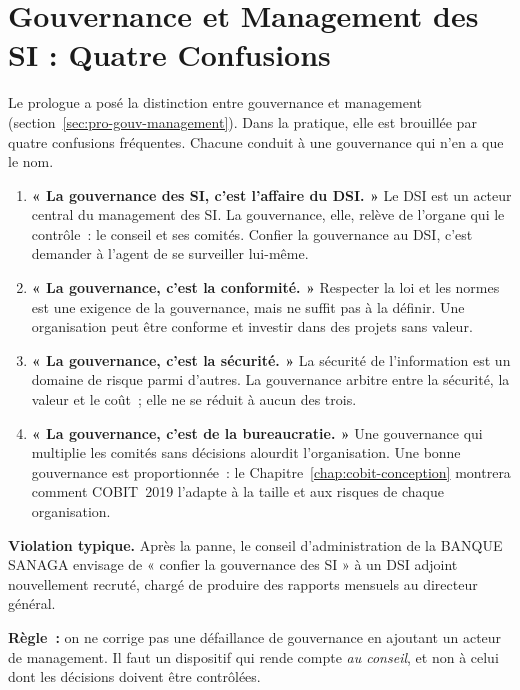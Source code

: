 \section{Gouvernance et Management des SI : Quatre Confusions}
\label{sec:c01-confusions}

Le prologue a posé la distinction entre gouvernance et management
(section~\ref{sec:pro-gouv-management}). Dans la pratique, elle est
brouillée par quatre confusions fréquentes. Chacune conduit à une
gouvernance qui n'en a que le nom.

\begin{enumerate}
    \item \textbf{« La gouvernance des SI, c'est l'affaire du DSI. »} Le DSI
          est un acteur central du management des SI. La gouvernance, elle,
          relève de l'organe qui le contrôle~: le conseil et ses comités.
          Confier la gouvernance au DSI, c'est demander à l'agent de se
          surveiller lui-même.
    \item \textbf{« La gouvernance, c'est la conformité. »} Respecter la
          loi et les normes est une exigence de la gouvernance, mais ne
          suffit pas à la définir. Une organisation peut être conforme et
          investir dans des projets sans valeur.
    \item \textbf{« La gouvernance, c'est la sécurité. »} La sécurité de
          l'information est un domaine de risque parmi d'autres. La
          gouvernance arbitre entre la sécurité, la valeur et le coût~;
          elle ne se réduit à aucun des trois.
    \item \textbf{« La gouvernance, c'est de la bureaucratie. »} Une
          gouvernance qui multiplie les comités sans décisions alourdit
          l'organisation. Une bonne gouvernance est proportionnée~: le
          Chapitre~\ref{chap:cobit-conception} montrera comment COBIT~2019
          l'adapte à la taille et aux risques de chaque organisation.
\end{enumerate}

\begin{boxalert}
\textbf{Violation typique.} Après la panne, le conseil d'administration de
la BANQUE SANAGA envisage de « confier la gouvernance des SI » à un DSI
adjoint nouvellement recruté, chargé de produire des rapports mensuels au
directeur général.

\smallskip
\textbf{Règle~:} on ne corrige pas une défaillance de gouvernance en
ajoutant un acteur de management. Il faut un dispositif qui rende compte
\emph{au conseil}, et non à celui dont les décisions doivent être
contrôlées.
\end{boxalert}

